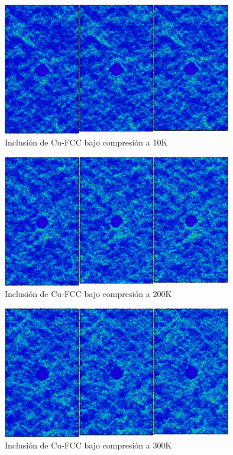 \documentclass[10pt, oneside]{article} %
\begin{document}
\begin{figure}[H]
\centering
\includegraphics[width=10cm]{Figures/NanoParticles/Snapshots/cuSphereCompression_10K_Snapshots.png}
\caption{Inclusión de Cu-FCC bajo compresión a 10K}
\end{figure}

\begin{figure}[H]
\centering
\includegraphics[width=10cm]{Figures/NanoParticles/Snapshots/cuSphereCompression_200K_Snapshots.png}
\caption{Inclusión de Cu-FCC bajo compresión a 200K}
\end{figure}

\begin{figure}[H]
\centering
\includegraphics[width=10cm]{Figures/NanoParticles/Snapshots/cuSphereCompression_300K_Snapshots.png}
\caption{Inclusión de Cu-FCC bajo compresión a 300K}
\end{figure}
\end{document}
